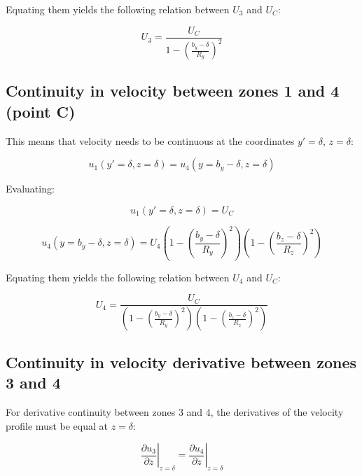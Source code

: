 Equating them yields the following relation between $U_3$ and $U_C$:

\begin{equation}
\label{eq:3D_BL_relation_Uc_U3}
\boxed{
U_3 = \frac{U_C}{1 - \left( \frac{b_y - \delta}{R_y} \right)^2 }
}
\end{equation}

\subsection{Continuity in velocity between zones 1 and 4 (point C)}

This means that velocity needs to be continuous at the coordinates $y' = \delta$, $z = \delta$:

\begin{equation}
u_1 \left( y' = \delta, z = \delta \right) = u_4 \left( y = b_y - \delta, z = \delta \right)
\end{equation}

Evaluating:

\begin{equation}
u_1 \left( y' = \delta, z = \delta \right) = U_C 
\end{equation}

\begin{equation}
u_4 \left( y = b_y - \delta, z = \delta \right) = U_4 \left( 1 - \left( \frac{b_y - \delta}{R_y} \right)^2 \right) \left( 1 - \left( \frac{b_z - \delta}{R_z} \right)^2 \right) 
\end{equation}

Equating them yields the following relation between $U_4$ and $U_C$:

\begin{equation}
\label{eq:3D_BL_relation_Uc_U4}
\boxed{
U_4 = \frac{U_C}{ \left( 1 - \left( \frac{b_y - \delta}{R_y} \right)^2 \right) \left( 1 - \left( \frac{b_z - \delta}{R_z} \right)^2 \right) }
}
\end{equation}

\subsection{Continuity in velocity derivative between zones 3 and 4}

For derivative continuity between zones $3$ and $4$, the derivatives of the velocity profile must be equal at $z = \delta$: 

\begin{equation}
\left. \frac{\partial u_3}{\partial z}  \right|_{z = \delta} = \left. \frac{\partial u_4}{\partial z}  \right|_{z = \delta}
\end{equation}

